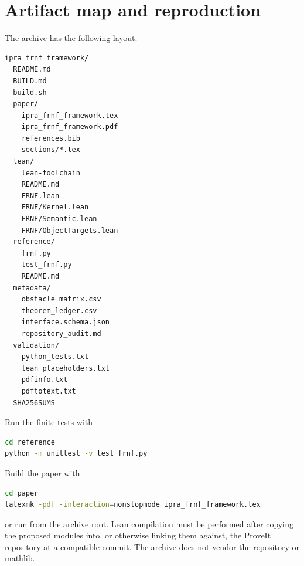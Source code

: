 \section{Artifact map and reproduction}
\label{app:artifacts}

The archive has the following layout.

\begin{lstlisting}
ipra_frnf_framework/
  README.md
  BUILD.md
  build.sh
  paper/
    ipra_frnf_framework.tex
    ipra_frnf_framework.pdf
    references.bib
    sections/*.tex
  lean/
    lean-toolchain
    README.md
    FRNF.lean
    FRNF/Kernel.lean
    FRNF/Semantic.lean
    FRNF/ObjectTargets.lean
  reference/
    frnf.py
    test_frnf.py
    README.md
  metadata/
    obstacle_matrix.csv
    theorem_ledger.csv
    interface.schema.json
    repository_audit.md
  validation/
    python_tests.txt
    lean_placeholders.txt
    pdfinfo.txt
    pdftotext.txt
  SHA256SUMS
\end{lstlisting}

Run the finite tests with

\begin{lstlisting}[language=bash]
cd reference
python -m unittest -v test_frnf.py
\end{lstlisting}

Build the paper with

\begin{lstlisting}[language=bash]
cd paper
latexmk -pdf -interaction=nonstopmode ipra_frnf_framework.tex
\end{lstlisting}

or run  from the archive root.  Lean compilation must be performed
after copying the proposed modules into, or otherwise linking them against, the ProveIt
repository at a compatible commit.  The archive does not vendor the repository or
mathlib.
